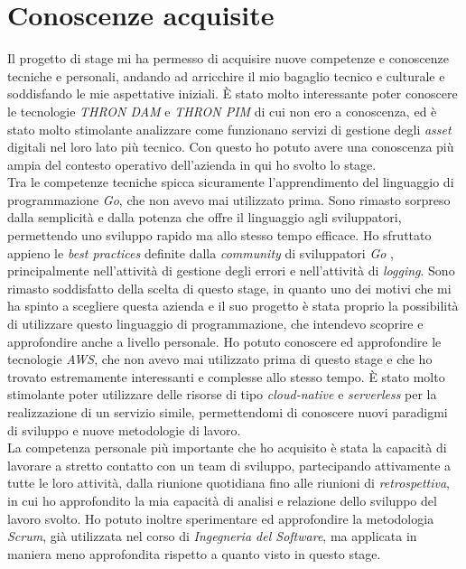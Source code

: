 \section{Conoscenze acquisite}
Il progetto di stage mi ha permesso di acquisire nuove competenze e conoscenze
tecniche e personali, andando ad arricchire il mio bagaglio tecnico e culturale
e soddisfando le mie aspettative iniziali. È stato molto interessante poter conoscere le tecnologie \emph{THRON DAM} e
\emph{THRON PIM} di cui non ero a conoscenza, ed è stato molto stimolante
analizzare come funzionano servizi di gestione degli \emph{asset} digitali nel
loro lato più tecnico. Con questo ho potuto avere una conoscenza più ampia del
contesto operativo dell'azienda in qui ho svolto lo stage.\\
Tra le competenze tecniche spicca sicuramente l'apprendimento del linguaggio di
programmazione \emph{Go}, che non avevo mai utilizzato prima. Sono rimasto
sorpreso dalla semplicità e dalla potenza che offre il linguaggio agli
sviluppatori, permettendo uno sviluppo rapido ma allo stesso tempo
efficace. Ho sfruttato appieno le \emph{best practices} definite dalla
\emph{community} di sviluppatori \emph{Go} \cite{effective-go}, principalmente nell'attività di
gestione degli errori e nell'attività di \emph{logging}. Sono rimasto
soddisfatto della scelta di questo stage, in quanto uno dei motivi che mi ha
spinto a scegliere questa azienda e il suo progetto è stata proprio la
possibilità di utilizzare questo linguaggio di programmazione, che intendevo
scoprire e approfondire anche a livello personale.
Ho potuto conoscere ed approfondire le tecnologie \emph{AWS}, che non avevo mai
utilizzato prima di questo stage e che ho trovato estremamente interessanti e
complesse allo stesso tempo. È stato molto stimolante poter utilizzare delle
risorse di tipo \emph{cloud-native} e \emph{serverless} per la realizzazione di
un servizio simile, permettendomi di conoscere nuovi paradigmi di sviluppo e
nuove metodologie di lavoro.\\
La competenza personale più importante che ho acquisito è stata la capacità di
lavorare a stretto contatto con un team di sviluppo, partecipando attivamente a
tutte le loro attività, dalla riunione quotidiana fino alle riunioni di
\emph{retrospettiva}, in cui ho approfondito la mia capacità di analisi e
relazione dello sviluppo del lavoro svolto. Ho potuto inoltre sperimentare ed
approfondire la metodologia \emph{Scrum}, già utilizzata nel corso di
\emph{Ingegneria del Software}, ma applicata in maniera meno approfondita
rispetto a quanto visto in questo stage.

